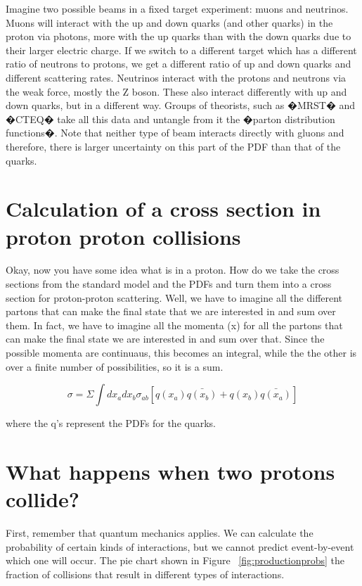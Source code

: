 Imagine two possible beams in a fixed target experiment: muons and neutrinos.  Muons will interact with the up and down quarks (and other quarks) in the  proton via photons, more with the up quarks than with the down quarks due to their larger electric charge. If we switch to a different target which has a different ratio of neutrons to protons, we get a different ratio of up and down quarks and different scattering rates.  Neutrinos interact with the protons and neutrons via the weak force, mostly the Z boson.  These also interact differently with up and down quarks, but in a different way.  Groups of theorists, such as �MRST� and �CTEQ� take all this data and untangle from it the �parton distribution functions�.  Note that neither type of beam interacts directly with gluons and therefore, there is larger uncertainty on this part of the PDF than that of the quarks.

\section{Calculation of a cross section in proton proton collisions}

Okay, now you have some idea what is in a proton. How do we take the cross sections from the standard model and the PDFs and turn them into a cross section for proton-proton scattering.  Well, we have to imagine all the different partons that can make the final state that we are interested in and sum over them.  In fact, we have to imagine all the momenta (x) for all the partons that can make the final state we are interested in and sum over that.  Since the possible momenta are continuaus, this becomes an integral, while the the other is over a finite number of possibilities, so it is a sum.



\begin{equation}
\sigma = \Sigma \int{dx_a dx_b \sigma_{ab}[q(x_a)\bar{q(x_b)}+q(x_b)\bar{q(x_a)}]}
\end{equation}

where the q's represent the PDFs for the quarks.

\section{What happens when two protons collide?}
First, remember that quantum mechanics applies.  We can calculate the probability of certain kinds of interactions, but we cannot predict event-by-event which one will occur.  The pie chart shown in Figure ~\ref{fig:productionprobs} the fraction of collisions that result in different types of interactions.

